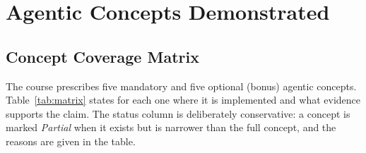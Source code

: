 \chapter{Agentic Concepts Demonstrated}\label{ch:concepts}
\section{Concept Coverage Matrix}
The course prescribes five mandatory and five optional (bonus) agentic concepts. Table~\ref{tab:matrix} states for each one where it is implemented and what evidence supports the claim. The status column is deliberately conservative: a concept is marked \emph{Partial} when it exists but is narrower than the full concept, and the reasons are given in the table.

